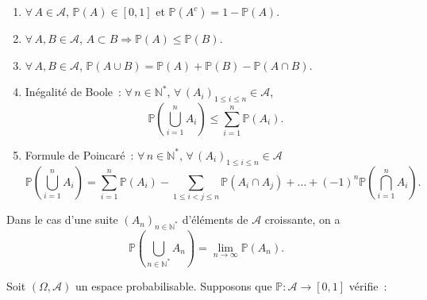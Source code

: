 \begin{proposition}\label{I-elemprop}

\begin{enumerate}
\def\labelenumi{\arabic{enumi}.}
\tightlist
\item
  \(\forall\, A \in \mathcal{A}\), \(\mathbb{P}(A) \in [0,1]\) et
  \(\mathbb{P}(A^c)= 1-\mathbb{P}(A)\).
\item
  \(\forall\, A,B \in \mathcal{A}\),
  \(A \subset B \Rightarrow \mathbb{P}(A) \leq \mathbb{P}(B)\).
\item
  \(\forall\, A,B \in \mathcal{A}\),
  \(\mathbb{P}(A \cup B ) = \mathbb{P}(A) + \mathbb{P}(B) - \mathbb{P}(A \cap B)\).
\item
  Inégalité de Boole~: \(\forall\, n \in \mathbb{N}^\ast\),
  \(\forall\, (A_i)_{1 \leq i \leq n} \in \mathcal{A}\),
  \[\mathbb{P}\left(\bigcup_{i=1}^n A_i\right) \leq \sum_{i=1}^n \mathbb{P}(A_i).\]
\item
  Formule de Poincaré~: \(\forall\, n \in \mathbb{N}^\ast\),
  \(\forall\, (A_i)_{1 \leq i \leq n} \in \mathcal{A}\)
  \[ \mathbb{P}\left(\bigcup_{i=1}^n A_i\right) = \sum_{i=1}^n \mathbb{P}(A_i) - \sum_{1 \leq i < j \leq n} \mathbb{P}(A_i \cap A_j) + \ldots + (-1)^n \mathbb{P}\left(\bigcap_{i=1}^n A_i\right).\]
\end{enumerate}
\end{proposition}

\label{I-propelem}

\begin{theoreme}\label{I-continuitemonotone}

Dans le cas d'une suite \((A_n)_{n\in\mathbb{N}^\ast}\) d'éléments de
\(\mathcal{A}\) croissante, on a
\[ \mathbb{P}\left(\bigcup_{n\in\mathbb{N}^\ast} A_n\right) = \lim_{n \rightarrow \infty} \mathbb{P}(A_n).\]
\end{theoreme}

\label{I-contmon}

\label{I-altdef}
Soit \((\Omega, \mathcal{A})\) un espace probabilisable. Supposons que
\(\mathbb{P}: \mathcal{A}\to [0,1]\) vérifie~:

